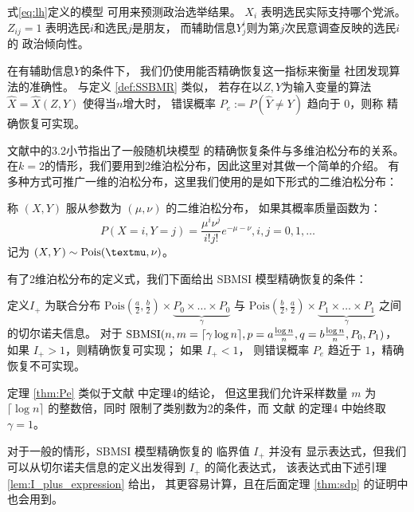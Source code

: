  式\eqref{eq:lh}定义的模型
 可用来预测政治选举结果。
 $X_i$ 表明选民实际支持哪个党派。
 $Z_{ij}=1$
 表明选民$i$和选民$j$是朋友，
 而辅助信息$Y_j^i$则为第$j$次民意调查反映的选民$i$的
 政治倾向性。


 在有辅助信息$Y$的条件下，
 我们仍使用能否精确恢复这一指标来衡量
 社团发现算法的准确性。
 与定义 \ref{def:SSBMR} 类似，
 若存在以$Z,Y$为输入变量的算法 $\hat{X}=\hat{X}(Z,Y)$
 使得当$n$增大时，
 错误概率
 $P_e:=P(\hat{Y} \neq Y)$ 趋向于 $0$，则称
 精确恢复可实现。

 文献中的3.2小节指出了一般随机块模型
 的精确恢复条件与多维泊松分布的关系。
在$k=2$的情形，我们要用到2维泊松分布，因此这里对其做一个简单的介绍。
有多种方式可推广一维的泊松分布，这里我们使用的是如下形式的二维泊松分布：

\begin{definition}
    称 $(X,Y)$ 服从参数为 $(\mu, \nu)$ 的二维泊松分布，
    如果其概率质量函数为：
    \begin{equation}
        P(X=i, Y=j) = \frac{\mu^i \nu^j}{i! j!}
        e^{- \mu - \nu}, i,j=0,1,\dots
    \end{equation}
    记为 $(X,Y) \sim \Pois(\mu, \nu)$。
\end{definition}

有了2维泊松分布的定义式，我们下面给出
SBMSI 模型精确恢复的条件：
\begin{theorem}\label{thm:Pe}
    定义$I_+$ 为联合分布 $\textrm{Pois}(\frac{a}{2},\frac{b}{2})\times \underbrace{P_0 \times \dots \times P_0}_{\gamma}$
    与 $\textrm{Pois}(\frac{b}{2}, \frac{a}{2})\times \underbrace{P_1 \times \dots \times P_1}_{\gamma}$ 
    之间的切尔诺夫信息。    
    对于 $\operatorname{SBMSI}(n,m=\lceil \gamma \log n \rceil, p=a\frac{\log n}{n},q=b\frac{\log n}{n},P_0,P_1)$，
    如果 $I_+>1$，则精确恢复可实现；
    如果 $I_+ < 1$，
    则错误概率 $P_e$ 趋近于 $1$，精确恢复不可实现。
\end{theorem}

定理 \ref{thm:Pe} 类似于文献  中定理4的结论，
但这里我们允许采样数量 $m$ 为
$\lceil \log n \rceil $ 的整数倍，同时
限制了类别数为2的条件，而 文献  的定理4
中始终取$\gamma=1$。

对于一般的情形，SBMSI 模型精确恢复的 临界值 $I_+$ 并没有
显示表达式，但我们可以从切尔诺夫信息的定义出发得到 $I_+$ 的简化表达式，
该表达式由下述引理 \ref{lem:I_plus_expression} 给出，
其更容易计算，且在后面定理 \ref{thm:sdp} 的证明中也会用到。

